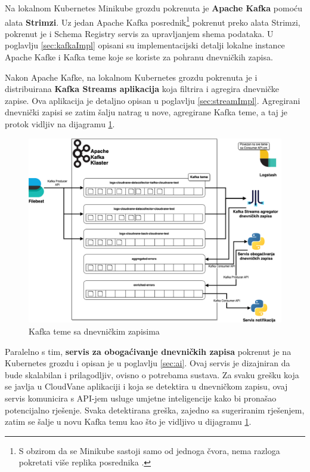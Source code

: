 \documentclass[times, utf8, diplomski]{fer}
\begin{document}
Na lokalnom Kubernetes Minikube grozdu pokrenuta je \textbf{Apache Kafka} pomoću alata \textbf{Strimzi}. Uz jedan Apache Kafka posrednik\footnote{S obzirom da se Minikube sastoji samo od jednoga čvora, nema razloga pokretati više replika posrednika .}  pokrenut preko alata Strimzi, pokrenut je i Schema Registry servis za upravljanjem shema podataka. U poglavlju \ref{sec:kafkaImpl} opisani su implementacijski detalji lokalne instance Apache Kafke i Kafka teme koje se koriste za pohranu dnevničkih zapisa.

Nakon Apache Kafke, na lokalnom Kubernetes grozdu pokrenuta je i distribuirana \textbf{Kafka Streams aplikacija} koja filtrira i agregira dnevničke zapise. Ova aplikacija je detaljno opisan u poglavlju \ref{sec:streamImpl}. Agregirani dnevnički zapisi se zatim šalju natrag u nove, agregirane Kafka teme, a taj je protok vidljiv na dijagramu \ref{fig:topics}.

\begin{figure}[htb]
	\centering
	\includegraphics[width=15cm]{images/KafkaTopics.png}
	\caption[Kafka teme sa dnevničkim zapisima]{Kafka teme  sa dnevničkim zapisima }
	\label{fig:topics}
\end{figure}

Paralelno s tim, \textbf{servis za obogaćivanje dnevničkih zapisa} pokrenut je na Kubernetes grozdu i opisan je u poglavlju \ref{sec:ai}. Ovaj servis je dizajniran da bude skalabilan i prilagodljiv, ovisno o potrebama sustava. Za svaku grešku koja se javlja u CloudVane aplikaciji i koja se detektira u dnevničkom zapisu, ovaj servis komunicira s API-jem usluge umjetne inteligencije kako bi pronašao potencijalno rješenje. Svaka detektirana greška, zajedno sa sugeriranim rješenjem, zatim se šalje u novu Kafka temu kao što je vidljivo u dijagramu \ref{fig:topics}.
\end{document}
